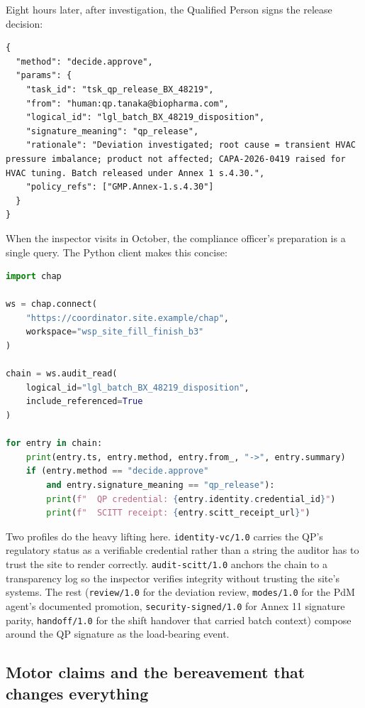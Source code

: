 \documentclass[11pt]{article}
\begin{document}
Eight hours later, after investigation, the Qualified Person signs the release decision:

\begin{lstlisting}[caption={Qualified Person release.},label={lst:case10-release}]
{
  "method": "decide.approve",
  "params": {
    "task_id": "tsk_qp_release_BX_48219",
    "from": "human:qp.tanaka@biopharma.com",
    "logical_id": "lgl_batch_BX_48219_disposition",
    "signature_meaning": "qp_release",
    "rationale": "Deviation investigated; root cause = transient HVAC pressure imbalance; product not affected; CAPA-2026-0419 raised for HVAC tuning. Batch released under Annex 1 s.4.30.",
    "policy_refs": ["GMP.Annex-1.s.4.30"]
  }
}
\end{lstlisting}

When the inspector visits in October, the compliance officer's preparation is a single query. The Python client makes this concise:

\begin{lstlisting}[language=Python,caption={Compliance officer prepares for inspection.},label={lst:case10-prep}]
import chap

ws = chap.connect(
    "https://coordinator.site.example/chap",
    workspace="wsp_site_fill_finish_b3"
)

chain = ws.audit_read(
    logical_id="lgl_batch_BX_48219_disposition",
    include_referenced=True
)

for entry in chain:
    print(entry.ts, entry.method, entry.from_, "->", entry.summary)
    if (entry.method == "decide.approve"
        and entry.signature_meaning == "qp_release"):
        print(f"  QP credential: {entry.identity.credential_id}")
        print(f"  SCITT receipt: {entry.scitt_receipt_url}")
\end{lstlisting}

Two profiles do the heavy lifting here. \texttt{identity-vc/1.0} carries the QP's regulatory status as a verifiable credential rather than a string the auditor has to trust the site to render correctly. \texttt{audit-scitt/1.0} anchors the chain to a transparency log so the inspector verifies integrity without trusting the site's systems. The rest (\texttt{review/1.0} for the deviation review, \texttt{modes/1.0} for the PdM agent's documented promotion, \texttt{security-signed/1.0} for Annex 11 signature parity, \texttt{handoff/1.0} for the shift handover that carried batch context) compose around the QP signature as the load-bearing event.

\subsection{Motor claims and the bereavement that changes everything}
\end{document}
